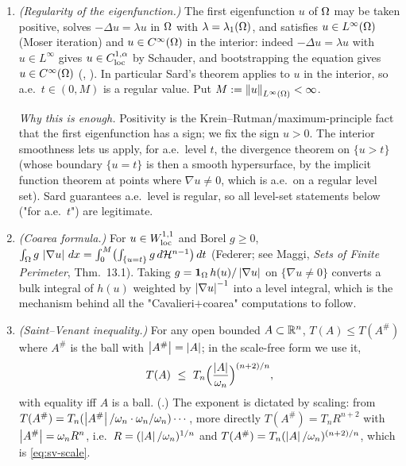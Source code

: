 \begin{enumerate}[label=\textup{(R\arabic*)}]
\item\label{R:reg} \emph{(Regularity of the eigenfunction.)} The first
eigenfunction $u$ of $\Omega$ may be taken positive, solves
$-\Delta u=\lambda u$ in $\Omega$ with $\lambda=\lambda_1(\Omega)$, and satisfies
$u\in L^\infty(\Omega)$ (Moser iteration) and $u\in C^\infty(\Omega)$ in the
interior: indeed $-\Delta u=\lambda u$ with $u\in L^\infty$ gives $u\in
C^{1,\alpha}_{\rm loc}$ by Schauder, and bootstrapping the equation gives
$u\in C^\infty(\Omega)$ (\cite[Prop.~2.4]{Brasco2014}, \cite{GilbargTrudinger2001}).
In particular Sard's theorem applies to $u$ in the interior, so a.e.\
$t\in(0,M)$ is a regular value. Put $M:=\left\|u\right\|_{L^\infty(\Omega)}<\infty$.

\emph{Why this is enough.} Positivity is the Krein--Rutman/maximum-principle
fact that the first eigenfunction has a sign; we fix the sign $u>0$. The
interior smoothness lets us apply, for a.e.\ level $t$, the divergence
theorem on $\{u>t\}$ (whose boundary $\{u=t\}$ is then a smooth
hypersurface, by the implicit function theorem at points where
$\nabla u\ne0$, which is a.e.\ on a regular level set). Sard guarantees
a.e.\ level is regular, so all level-set statements below ("for a.e.\ $t$")
are legitimate.

\item\label{R:coarea} \emph{(Coarea formula.)} For $u\in W^{1,1}_{\rm loc}$
and Borel $g\ge0$,
$\int_\Omega g\,\left|\nabla u\right|\,dx=\int_0^M\bigl(\int_{\{u=t\}}g\,d\mathcal H^{n-1}\bigr)\,dt$
(Federer; see Maggi, \emph{Sets of Finite Perimeter}, Thm.~13.1). Taking
$g=\mathbf 1_{\Omega}\,h(u)/\left|\nabla u\right|$ on $\{\nabla u\ne0\}$ converts a
bulk integral of $h(u)$ weighted by $\left|\nabla u\right|^{-1}$ into a level
integral, which is the mechanism behind all the "Cavalieri$+$coarea"
computations to follow.

\item\label{R:saint-venant} \emph{(Saint--Venant inequality.)} For any open
bounded $A\subset\mathbb R^n$, $T(A)\le T(A^\#)$ where $A^\#$ is the ball with
$\left|A^\#\right|=\left|A\right|$; in the scale-free form we use it,
\begin{equation}\label{eq:sv-scale}
  T(A)\ \le\ T_n\Bigl(\frac{\left|A\right|}{\omega_n}\Bigr)^{(n+2)/n},
\end{equation}
with equality iff $A$ is a ball. (\cite[(1.7) with $p=2$]{Brasco2014}.)
The exponent is dictated by scaling: from $T(A^\#)=T_n(\left|A^\#\right|/\omega_n
\cdot\omega_n/\omega_n)\cdots$, more directly $T(A^\#)=T_n R^{n+2}$ with
$\left|A^\#\right|=\omega_n R^n$, i.e.\ $R=(\left|A\right|/\omega_n)^{1/n}$ and
$T(A^\#)=T_n(\left|A\right|/\omega_n)^{(n+2)/n}$, which is \eqref{eq:sv-scale}.


\end{enumerate}

